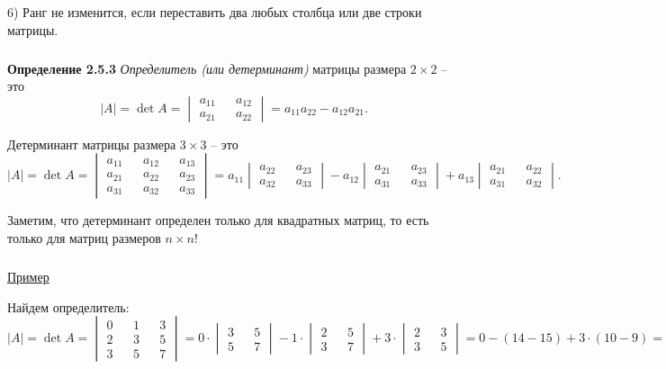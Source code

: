 \documentclass[12pt,a4paper]{article}
\begin{document}
6) Ранг не изменится, если переставить два любых столбца или две строки матрицы.


\subparagraph{}
\textbf{Определение 2.5.3} 
\textit{Определитель (или детерминант)} матрицы размера $2 \times 2$ -- это
\[|A| = \det A = \begin{vmatrix}
a_{11} && a_{12} \\
a_{21} && a_{22} 
\end{vmatrix} = a_{11}a_{22} - a_{12}a_{21}.
\]

Детерминант матрицы размера $3 \times 3$ -- это 
\[|A| = \det A = \begin{vmatrix}
a_{11} && a_{12} && a_{13} \\
a_{21} && a_{22} && a_{23} \\
a_{31} && a_{32} && a_{33}
\end{vmatrix} = a_{11} \begin{vmatrix}
a_{22} && a_{23} \\
a_{32} && a_{33} 
\end{vmatrix} - a_{12} \begin{vmatrix}
a_{21} && a_{23} \\
a_{31} && a_{33} 
\end{vmatrix} + a_{13} \begin{vmatrix}
a_{21} && a_{22} \\
a_{31} && a_{32} 
\end{vmatrix} .
\]

Заметим, что детерминант определен только для квадратных матриц, то есть только для матриц размеров $n \times n$!

\subparagraph{}
\underline{Пример}

Найдем определитель:
\[ |A| = \det A = \begin{vmatrix}
0 && 1 && 3 \\
2 && 3 && 5 \\
3 && 5 && 7
\end{vmatrix} = 0 \cdot \begin{vmatrix}
3 && 5 \\
5 && 7
\end{vmatrix} - 1 \cdot \begin{vmatrix}
2 && 5 \\
3 && 7 
\end{vmatrix} + 3 \cdot \begin{vmatrix}
2 && 3 \\
3 && 5
\end{vmatrix} = 0 - (14 - 15) + 3 \cdot (10 - 9) = 4
\]
\end{document}
